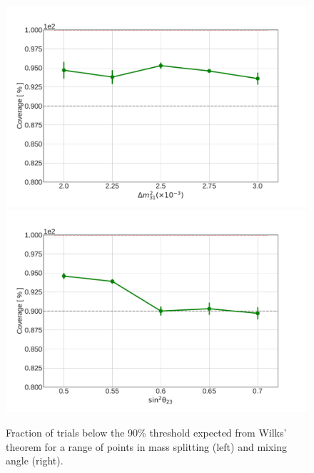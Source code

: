 \begin{figure}
    \centering
    \includegraphics[width=0.45\linewidth]{figures/measurement/three_flavor/coverage_test/coverage_dm_v3.pdf}
    \includegraphics[width=0.45\linewidth]{figures/measurement/three_flavor/coverage_test/coverage_t23_v3.pdf}
    \caption{Fraction of trials below the 90\% threshold expected from Wilks' theorem for a range of points in mass splitting (left) and mixing angle (right).}
    \label{fig:three-flavor-coverage}
\end{figure}